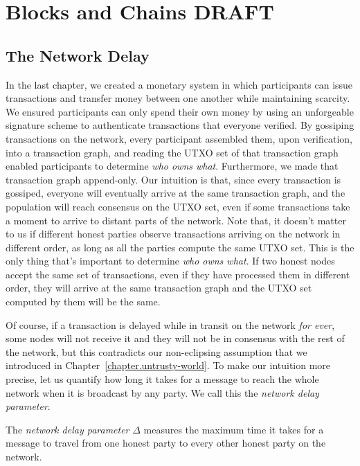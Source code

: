 \chapter{Blocks and Chains \small{\textsf{DRAFT}}}

\section{The Network Delay}

In the last chapter, we created a monetary system in which participants can issue transactions
and transfer money between one another while maintaining scarcity. We ensured participants can
only spend their own money by using an unforgeable signature scheme to authenticate transactions
that everyone verified. By gossiping transactions on the network, every participant assembled
them, upon verification, into a transaction graph, and reading the UTXO set of that transaction
graph enabled participants to determine \emph{who owns what}.
Furthermore, we made that transaction graph append-only. Our intuition is that, since every
transaction is gossiped, everyone will eventually arrive at the same transaction graph,
and the population will reach consensus on the UTXO set, even if some transactions take
a moment to arrive to distant parts of the network. Note that, it doesn't matter to us if
different honest parties observe transactions arriving on the network in different order,
as long as all the parties compute the same UTXO set. This is the only thing that's important
to determine \emph{who owns what}. If two honest nodes accept the same set of transactions,
even if they have processed them in different order, they will arrive at the same transaction
graph and the UTXO set computed by them will be the same.

Of course, if a transaction is delayed while in transit on the network \emph{for ever}, some nodes
will not receive it and they will not be in consensus with the rest of the network, but this
contradicts our non-eclipsing assumption that we introduced in
Chapter~\ref{chapter.untrusty-world}. To make our intuition more precise, let us quantify how
long it takes for a message to reach the whole network when it is broadcast by any party.
We call this the \emph{network delay parameter}.

\begin{definition}
  The \emph{network delay parameter} $\Delta$ measures the maximum time it takes
  for a message to travel from one honest party to every other honest party on the
  network.
\end{definition}

